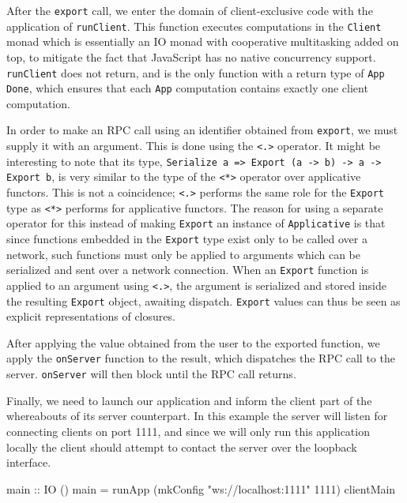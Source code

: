 \documentclass[preprint]{sigplanconf}
\begin{document}
After the \lstinline!export! call, we enter the domain of client-exclusive code
with the application of \lstinline!runClient!. This function executes
computations in the \lstinline!Client! monad which is essentially an
IO monad with cooperative multitasking added on top, to mitigate the fact that
JavaScript has no native concurrency support. \lstinline!runClient! does not
return, and is the only function with a return type of \lstinline!App Done!,
which ensures that each \lstinline!App! computation contains exactly one client
computation.

In order to make an RPC call using an identifier obtained from
\lstinline!export!, we must supply it with an argument. This is done using the
\lstinline!<.>! operator. It might be interesting to note that its type,
\linebreak
\lstinline!Serialize a => Export (a -> b) -> a -> Export b!,
is very similar to the type of the \lstinline!<*>! operator over applicative
functors. This is not a coincidence; \lstinline!<.>! performs the same role
for the \lstinline!Export! type as \lstinline!<*>! performs for applicative
functors. The reason for using a separate operator for this instead of making
\lstinline!Export! an instance of \lstinline!Applicative! is that since
functions embedded in the \lstinline!Export! type exist only to be called over
a network, such functions must only be applied to arguments which can be
serialized and sent over a network connection. When an \lstinline!Export!
function is applied to an argument using \lstinline!<.>!, the argument is
serialized and stored inside the resulting \lstinline!Export! object, awaiting
dispatch. \lstinline!Export! values can thus be seen as explicit
representations of closures.

After applying the value obtained from the user to the exported function,
we apply the \lstinline!onServer! function to the result, which dispatches
the RPC call to the server. \lstinline!onServer! will then block until the
RPC call returns.

Finally, we need to launch our application and inform the client part of the
whereabouts of its server counterpart. In this example the server will listen
for connecting clients on port 1111, and since we will only run this
application locally the client should attempt to contact the server over the
loopback interface.

\begin{code}
main :: IO ()
main = runApp (mkConfig "ws://localhost:1111" 1111)
              clientMain
\end{code}
\end{document}
